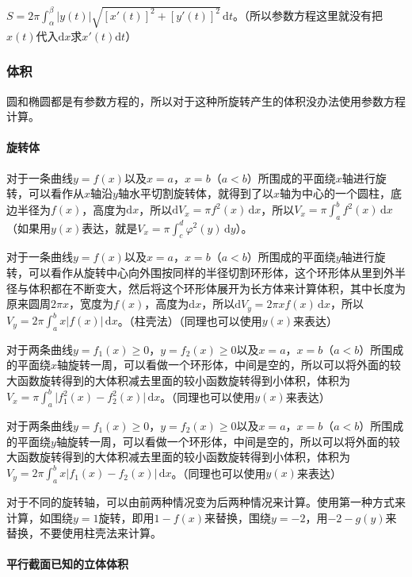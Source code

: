 \documentclass[UTF8, 12pt]{ctexart}
\begin{document}
$S=2\pi\int_\alpha^\beta\vert y(t)\vert\sqrt{[x'(t)]^2+[y'(t)]^2}\,\textrm{d}t$。（所以参数方程这里就没有把$x(t)$代入$\textrm{d}x$求$x'(t)\textrm{d}t$）

\subsubsection{体积}

圆和椭圆都是有参数方程的，所以对于这种所旋转产生的体积没办法使用参数方程计算。

\paragraph{旋转体} \leavevmode \medskip

对于一条曲线$y=f(x)$以及$x=a$，$x=b$（$a<b$）所围成的平面绕$x$轴进行旋转，可以看作从$x$轴沿$y$轴水平切割旋转体，就得到了以$x$轴为中心的一个圆柱，底边半径为$f(x)$，高度为$\textrm{d}x$，所以$\textrm{d}V_x=\pi f^2(x)\,\textrm{d}x$，所以$V_x=\pi\int_a^bf^2(x)\,\textrm{d}x$（如果用$y(x)$表达，就是$V_x=\pi\int_c^d\varphi^2(y)\,\textrm{d}y$）。

对于一条曲线$y=f(x)$以及$x=a$，$x=b$（$a<b$）所围成的平面绕$y$轴进行旋转，可以看作从旋转中心向外围按同样的半径切割环形体，这个环形体从里到外半径与体积都在不断变大，然后将这个环形体展开为长方体来计算体积，其中长度为原来圆周$2\pi x$，宽度为$f(x)$，高度为$\textrm{d}x$，所以$\textrm{d}V_y=2\pi xf(x)\,\textrm{d}x$，所以$V_y=2\pi\int_a^bx\vert f(x)\vert\,\textrm{d}x$。（柱壳法）（同理也可以使用$y(x)$来表达）

对于两条曲线$y=f_1(x)\geqslant0$，$y=f_2(x)\geqslant0$以及$x=a$，$x=b$（$a<b$）所围成的平面绕$x$轴旋转一周，可以看做一个环形体，中间是空的，所以可以将外面的较大函数旋转得到的大体积减去里面的较小函数旋转得到小体积，体积为$V_x=\pi\int_a^b\vert f_1^2(x)-f_2^2(x)\vert\,\textrm{d}x$。（同理也可以使用$y(x)$来表达）

对于两条曲线$y=f_1(x)\geqslant0$，$y=f_2(x)\geqslant0$以及$x=a$，$x=b$（$a<b$）所围成的平面绕$y$轴旋转一周，可以看做一个环形体，中间是空的，所以可以将外面的较大函数旋转得到的大体积减去里面的较小函数旋转得到小体积，体积为$V_y=2\pi\int_a^bx\vert f_1(x)-f_2(x)\vert\,\textrm{d}x$。（同理也可以使用$y(x)$来表达）

对于不同的旋转轴，可以由前两种情况变为后两种情况来计算。使用第一种方式来计算，如围绕$y=1$旋转，即用$1-f(x)$来替换，围绕$y=-2$，用$-2-g(y)$来替换，不要使用柱壳法来计算。

\paragraph{平行截面已知的立体体积} \leavevmode \medskip
\end{document}
